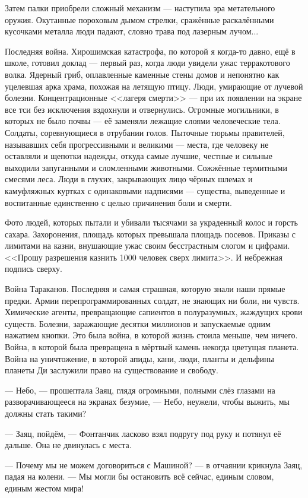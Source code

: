 Затем палки приобрели сложный механизм --- наступила эра метательного оружия.
Окутанные пороховым дымом стрелки, сражённые раскалёнными кусочками металла люди падают, словно трава под лазерным лучом...

Последняя война.
Хирошимская катастрофа, по которой я когда-то давно, ещё в школе, готовил доклад --- первый раз, когда люди увидели ужас терракотового волка.
Ядерный гриб, оплавленные каменные стены домов и непонятно как уцелевшая арка храма, похожая на летящую птицу.
Люди, умирающие от лучевой болезни.
Концентрационные <<лагеря смерти>> --- при их появлении на экране все тси без исключения вздохнули и отвернулись.
Огромные могильники, в которых не было почвы --- её заменяли лежащие слоями человеческие тела.
Солдаты, соревнующиеся в отрубании голов.
Пыточные тюрьмы правителей, называвших себя прогрессивными и великими --- места, где человеку не оставляли и щепотки надежды, откуда самые лучшие, честные и сильные выходили запуганными и сломленными животными.
Сожжённые термитными смесями леса.
Люди в глухих, закрывающих лицо чёрных шлемах и камуфляжных куртках с одинаковыми надписями --- существа, выведенные и воспитанные единственно с целью причинения боли и смерти.

Фото людей, которых пытали и убивали тысячами за украденный колос и горсть сахара.
Захоронения, площадь которых превышала площадь посевов.
Приказы с лимитами на казни, внушающие ужас своим бесстрастным слогом и цифрами.
<<Прошу разрешения казнить 1000 человек сверх лимита>>.
И небрежная подпись сверху.

Война Тараканов.
Последняя и самая страшная, которую знали наши прямые предки.
Армии перепрограммированных солдат, не знающих ни боли, ни чувств.
Химические агенты, превращающие сапиентов в полуразумных, жаждущих крови существ.
Болезни, заражающие десятки миллионов и запускаемые одним нажатием кнопки.
Это была война, в которой жизнь стоила меньше, чем ничего.
Война, в которой была превращена в мёртвый камень некогда цветущая планета.
Война на уничтожение, в которой апиды, кани, люди, планты и дельфины планеты Ди заслужили право на существование и свободу.

--- Небо, --- прошептала Заяц, глядя огромными, полными слёз глазами на разворачивающееся на экранах безумие, --- Небо, неужели, чтобы выжить, мы должны стать такими?

--- Заяц, пойдём, --- Фонтанчик ласково взял подругу под руку и потянул её дальше.
Она не двинулась с места.

--- Почему мы не можем договориться с Машиной? --- в отчаянии крикнула Заяц, падая на колени.
--- Мы могли бы остановить всё сейчас, единым словом, единым жестом мира!

